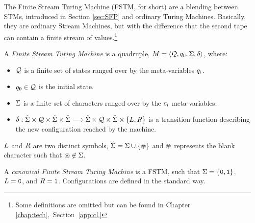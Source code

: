 The Finite Stream Turing Machine (FSTM, for short)
are a blending between
STMs, introduced in Section
\ref{sec:SFP} and ordinary Turing Machines.
Basically, they are ordinary Stream Machines, but
with the difference that the second tape can
contain a finite stream of values.\footnote{Some
definitions are omitted but can be found
in Chapter \ref{chap:tech},~Section~\ref{app:c1}}
%
\begin{defn}\label{df:FSTuringMachine}
A \emph{Finite Stream Turing Machine} is a quadruple,
$M = \langle \textcolor{black}{\mathcal{Q}}, \textcolor{black}{q_0}, \textcolor{black}{\Sigma}, \textcolor{black}{\delta}\rangle$,
where:
\begin{itemize}
\itemsep0em
%
\item $\textcolor{black}{\mathcal{Q}}$ is a finite set of states ranged over by the meta-variables
$\textcolor{black}{q_i}$.
%
\item $\textcolor{black}{q_0}\in \textcolor{black}{\mathcal{Q}}$ is the initial state.
%
\item $\textcolor{black}{\Sigma}$ is a finite set of characters
ranged over by the $\textcolor{black}{c_i}$ meta-variables.
%
\item $\textcolor{black}{\delta} : \textcolor{black}{\hat{\Sigma}} \times
\textcolor{black}{\mathcal{Q}} \times \textcolor{black}{\hat{\Sigma}} \times \textcolor{black}{\hat{\Sigma}} \longrightarrow \textcolor{black}{\hat{\Sigma}}
\times \textcolor{black}{\mathcal{Q}} \times \textcolor{black}{\hat{\Sigma}} \times
\{\textcolor{black}{L}, \textcolor{black}{R}\}$
is a transition function describing the new
configuration reached by the machine.
\end{itemize}
$\textcolor{black}{L}$ and $\textcolor{black}{R}$
are two distinct symbols,
$\textcolor{black}{\hat{\Sigma}} = \textcolor{black}{\Sigma} \cup \{\textcolor{black}{\circledast}\}$
and $\textcolor{black}{\circledast}$ represents the blank character
such that $\textcolor{black}{\circledast} \not \in \textcolor{black}{\Sigma}$.
\end{defn}
%
%
%
\noindent
%
A \emph{canonical Finite Stream Turing Machine} is a FSTM,
such that
$\textcolor{black}{\Sigma}=\{\textcolor{black}{\mathtt{0}}, \textcolor{black}{\mathtt{1}}\}$,
$\textcolor{black}{L}=\textcolor{black}{\mathtt{0}}$, and $\textcolor{black}{R}=\textcolor{black}{\mathtt{1}}$.
%
%
Configurations are defined in the standard way.
%


